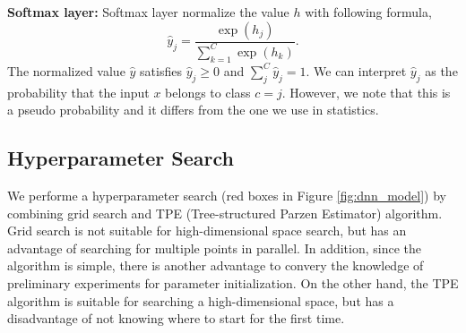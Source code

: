 \documentclass[useamsfonts]{pasj01}
\begin{document}
{\bf Softmax layer:}
Softmax layer normalize the value $h$ with following formula,
\begin{equation}
    \hat{y}_j = \frac{\exp \left( h_j \right)}{\sum_{k=1}^C \exp \left( h_k \right)}.
\end{equation}
The normalized value $\hat{y}$ satisfies $\hat{y}_j \geq 0$ and $\sum_j^C \hat{y}_j =1$.
We can interpret $\hat{y}_j$ as the probability that the input $x$ belongs to  class $c=j$.
However, we note that this is a pseudo probability and it differs from the one we use in statistics.
  
\subsection{Hyperparameter Search}\label{hyperparametersearch}
We performe a hyperparameter search (red boxes in Figure \ref{fig:dnn_model}) by combining grid search and TPE (Tree-structured Parzen Estimator) algorithm.
Grid search is not suitable for high-dimensional space search, but has an advantage of searching for multiple points in parallel.
In addition, since the algorithm is simple, there is another advantage to convery the knowledge of preliminary experiments for parameter initialization.
On the other hand, the TPE algorithm is suitable for searching a high-dimensional space, but has a disadvantage of not knowing where to start for the first time.
\end{document}
